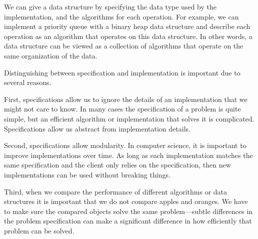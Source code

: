 \begin{example}
We can give a data structure by specifying the data type used by the implementation, and the algorithms for each operation.
%
For example, we can implement a priority queue with a binary heap data structure and describe each operation as an algorithm that operates on
this data structure.  
%
In other words, a data structure can be viewed as a collection of algorithms that operate on the same organization of the data.
\end{example}


\begin{remark}
%
Distinguishing between specification and implementation is important due to several reasons.

First, specifications allow us to ignore the details of an implementation that we might not care to know.
%
In many cases the specification of a problem is quite simple, but an efficient algorithm or implementation that solves it is complicated.
%
Specifications allow us abstract from implementation details.
%

Second, specifications allow modularity. In computer science, it is important to improve implementations over time.  As long as each implementation matches the same specification and the client only relies on the specification, then new implementations can be used without breaking things.
%

Third, when we compare the performance of different algorithms or data structures it is important that we do not compare apples and oranges. We have to make sure the compared objects solve the same problem---subtle differences in the problem specification can make a significant difference in how efficiently that problem can be solved.
\end{remark}
